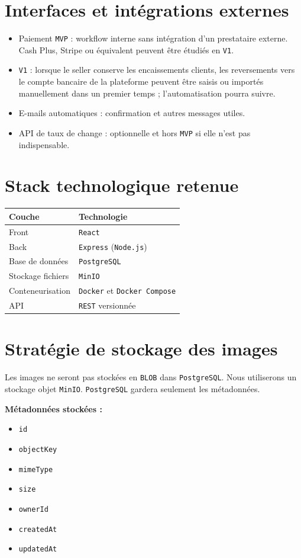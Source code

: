 \documentclass[11pt,a4paper]{scrreprt}
\newcommand{\code}[1]{\texttt{#1}}
\begin{document}
\section{Interfaces et intégrations externes}
\begin{itemize}
  \item Paiement \code{MVP} : workflow interne sans intégration d'un prestataire externe. Cash Plus, Stripe ou équivalent peuvent être étudiés en \code{V1}.
  \item \code{V1} : lorsque le seller conserve les encaissements clients, les reversements vers le compte bancaire de la plateforme peuvent être saisis ou importés manuellement dans un premier temps ; l'automatisation pourra suivre.
  \item E-mails automatiques : confirmation et autres messages utiles.
  \item API de taux de change : optionnelle et hors \code{MVP} si elle n'est pas indispensable.
\end{itemize}

\section{Stack technologique retenue}
\begin{table}[h]
\centering
\begin{tabular}{ll}
\toprule
Couche & Technologie \\
\midrule
Front & \code{React} \\
Back & \code{Express} (\code{Node.js}) \\
Base de données & \code{PostgreSQL} \\
Stockage fichiers & \code{MinIO} \\
Conteneurisation & \code{Docker} et \code{Docker Compose} \\
API & \code{REST} versionnée \\
\bottomrule
\end{tabular}
\end{table}

\section{Stratégie de stockage des images}
Les images ne seront pas stockées en \code{BLOB} dans \code{PostgreSQL}. Nous utiliserons un stockage objet \code{MinIO}. \code{PostgreSQL} gardera seulement les métadonnées.

\textbf{Métadonnées stockées :}
\begin{itemize}
  \item \code{id}
  \item \code{objectKey}
  \item \code{mimeType}
  \item \code{size}
  \item \code{ownerId}
  \item \code{createdAt}
  \item \code{updatedAt}
\end{itemize}
\end{document}
